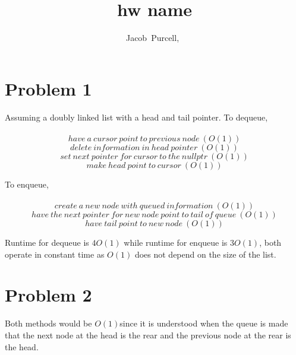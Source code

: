 \documentclass[journal]{IEEEtran}
\begin{document}
\title{hw name}

\author{Jacob~Purcell,~}

\maketitle
\section*{Problem 1}
Assuming a doubly linked list with a head and tail pointer. To dequeue, \\\\
\begin{equation}
    have~a~cursor~point~to~previous~node~(O(1))
\end{equation} 
\begin{equation}
    delete~information~in~head~pointer~(O(1))
\end{equation} 
\begin{equation}
    set~next~pointer~for~cursor~to~the~nullptr~(O(1))
\end{equation} 
\begin{equation}
    make~head~point~to~cursor~(O(1))
\end{equation} 

To enqueue,\\\\
\begin{equation}
    create~a~new~node~with~queued~information~(O(1))
\end{equation} 
\begin{equation}
    have~the~next~pointer~for~new~node~point~to~tail~of~queue~(O(1))
\end{equation} 
\begin{equation}
    have~tail~point~to~new~node~(O(1))
\end{equation} 

Runtime for dequeue is $4O(1)$ while runtime for enqueue is $3O(1)$, 
both operate in constant time as $O(1)$ does not depend on the size of the list.


\section*{Problem 2}
Both methods would be $O(1) $since it is understood when the queue is made that the next 
node at the head is the rear and the previous node at the rear is the head. \\\\
\end{document}
